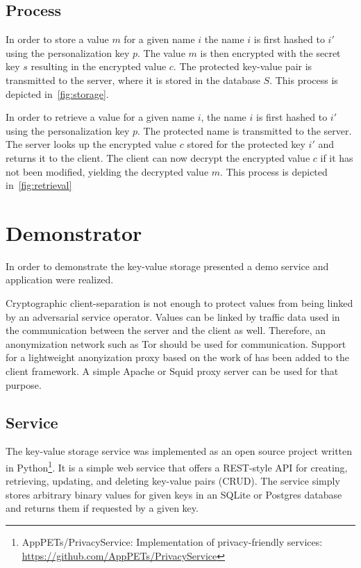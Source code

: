 \subsection{Process}
In order to store a value $m$ for a given name $i$ the name $i$ is first hashed to $i'$ using the personalization key $p$.
The value $m$ is then encrypted with the secret key $s$ resulting in the encrypted value $c$.
The protected key-value pair is transmitted to the server, where it is stored in the database $S$.
This process is depicted in~\cref{fig:storage}.

\begin{figure*}[t]
	\centering
	
	\caption{The process of retrieving a key-value pair.}%
	\label{fig:retrieval}
\end{figure*}

In order to retrieve a value for a given name $i$, the name $i$ is first hashed to $i'$ using the personalization key $p$.
The protected name is transmitted to the server.
The server looks up the encrypted value $c$ stored for the protected key $i'$ and returns it to the client.
The client can now decrypt the encrypted value $c$ if it has not been modified, yielding the decrypted value $m$.
This process is depicted in~\cref{fig:retrieval}

\section{Demonstrator}
In order to demonstrate the key-value storage presented a demo service and application were realized.

Cryptographic client-separation is not enough to protect values from being linked by an adversarial service operator.
Values can be linked by traffic data used in the communication between the server and the client as well.
Therefore, an anonymization network such as Tor should be used for communication.
Support for a lightweight anonyization proxy based on the work of \textcite{DBLP:conf/icccn/PanchenkoWPA09} has been added to the client framework.
A simple Apache or Squid proxy server can be used for that purpose.

\subsection{Service}
The key-value storage service was implemented as an open source project written in Python\footnote{AppPETs/PrivacyService: Implementation of privacy-friendly services: \url{https://github.com/AppPETs/PrivacyService}}.
It is a simple web service that offers a REST-style API for creating, retrieving, updating, and deleting key-value pairs (CRUD).
The service simply stores arbitrary binary values for given keys in an SQLite or Postgres database and returns them if requested by a given key.

